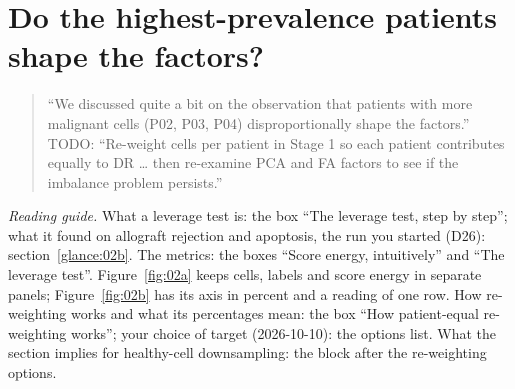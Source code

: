 \section{Do the highest-prevalence patients shape the factors?}
\label{sec:shape}

\begin{quote}
``We discussed quite a bit on the observation that patients with more malignant cells (P02, P03, P04) disproportionally shape the factors.''\\[2pt]
TODO: ``Re-weight cells per patient in Stage 1 so each patient contributes equally to DR \ldots{} then re-examine PCA and FA factors to see if the imbalance problem persists.''
\end{quote}

{\small\color{inkmuted}\emph{Reading guide.} What a leverage test is: the box ``The leverage test, step by step''; what it found on allograft rejection and apoptosis, the run you started (D26): section~\ref{glance:02b}. The metrics: the boxes ``Score energy, intuitively'' and ``The leverage test''. Figure~\ref{fig:02a} keeps cells, labels and score energy in separate panels; Figure~\ref{fig:02b} has its axis in percent and a reading of one row. How re-weighting works and what its percentages mean: the box ``How patient-equal re-weighting works''; your choice of target (2026-10-10): the options list. What the section implies for healthy-cell downsampling: the block after the re-weighting options.\par}

